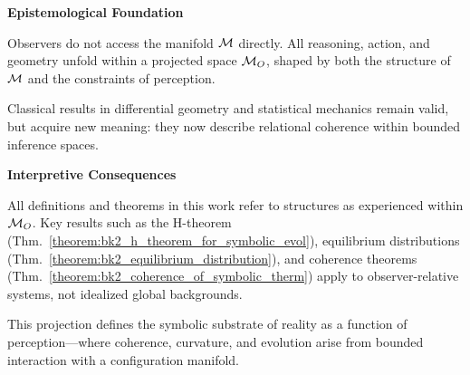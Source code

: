 \begin{tcolorbox}
\medskip
\noindent\textbf{Epistemological Foundation}

Observers do not access the manifold \(\mathcal{M}\) directly. All reasoning, action, and geometry unfold within a projected space \(\mathcal{M}_O\), shaped by both the structure of \(\mathcal{M}\) and the constraints of perception.

Classical results in differential geometry and statistical mechanics remain valid, but acquire new meaning: they now describe relational coherence within bounded inference spaces.

\medskip
\noindent\textbf{Interpretive Consequences}

All definitions and theorems in this work refer to structures as experienced within \(\mathcal{M}_O\). Key results such as the H-theorem (Thm.~\ref{theorem:bk2_h_theorem_for_symbolic_evol}), equilibrium distributions (Thm.~\ref{theorem:bk2_equilibrium_distribution}), and coherence theorems (Thm.~\ref{theorem:bk2_coherence_of_symbolic_therm}) apply to observer-relative systems, not idealized global backgrounds.

This projection defines the symbolic substrate of reality as a function of perception—where coherence, curvature, and evolution arise from bounded interaction with a configuration manifold.

\end{tcolorbox}
